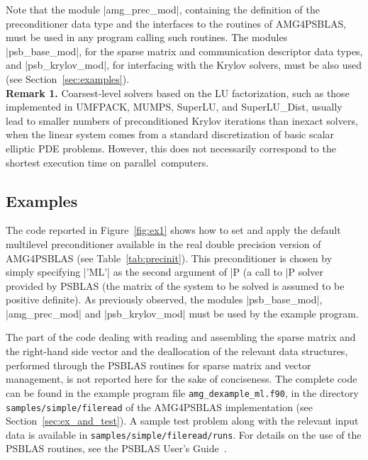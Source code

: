 Note that the module \fortinline|amg_prec_mod|, containing the definition of the
preconditioner data type and the interfaces to the routines of AMG4PSBLAS,
must be used in any program calling such routines.
The modules \fortinline|psb_base_mod|, for the sparse matrix and communication descriptor
data types, and \fortinline|psb_krylov_mod|, for interfacing with the
Krylov solvers, must be also used (see Section~\ref{sec:examples}). \\

\textbf{Remark 1.} Coarsest-level solvers based on the LU factorization,
such as those implemented in UMFPACK, MUMPS, SuperLU, and SuperLU\_Dist,
usually lead to smaller numbers of preconditioned Krylov
iterations than inexact solvers, when the linear system comes from
a standard discretization of basic scalar elliptic PDE problems. However,
this does not necessarily correspond to the shortest execution time
on parallel~computers.


\subsection{Examples\label{sec:examples}}

The code reported in Figure~\ref{fig:ex1} shows how to set and apply the default
multilevel preconditioner available in the real double precision version
of AMG4PSBLAS (see Table~\ref{tab:precinit}). This preconditioner is chosen
by simply specifying \fortinline|'ML'| as the second argument of \fortinline|P%
(a call to \fortinline|P%
solver provided by PSBLAS (the matrix of the system to be solved is
assumed to be positive definite). As previously observed, the modules
\fortinline|psb_base_mod|, \fortinline|amg_prec_mod| and \fortinline|psb_krylov_mod|
must be used by the example program.

The part of the code dealing with reading and assembling  the sparse
matrix and the right-hand side vector and the deallocation of the
relevant data structures, performed 
through the PSBLAS routines for sparse matrix and vector management, is not reported
here for the sake of conciseness.
The complete code can be found in the example program file \verb|amg_dexample_ml.f90|,
in the directory \verb|samples/simple/fileread| of the AMG4PSBLAS implementation (see
Section~\ref{sec:ex_and_test}). A sample test problem along with the relevant
input data is available in \verb|samples/simple/fileread/runs|.
For details on the use of the PSBLAS routines, see the PSBLAS User's
Guide~\cite{PSBLASGUIDE}.

